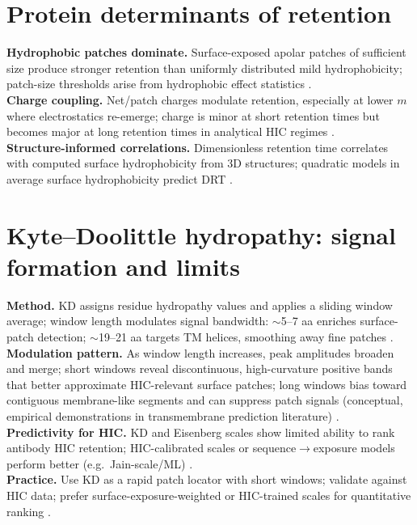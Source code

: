 \documentclass[11pt]{article}
\begin{document}
\section{Protein determinants of retention}
\textbf{Hydrophobic patches dominate.} Surface-exposed apolar patches of sufficient size produce stronger retention than uniformly distributed mild hydrophobicity; patch-size thresholds arise from hydrophobic effect statistics \cite{Waibl2022}. \\
\textbf{Charge coupling.} Net/patch charges modulate retention, especially at lower $m$ where electrostatics re-emerge; charge is minor at short retention times but becomes major at long retention times in analytical HIC regimes \cite{Hebditch2019}. \\
\textbf{Structure-informed correlations.} Dimensionless retention time correlates with computed surface hydrophobicity from 3D structures; quadratic models in average surface hydrophobicity predict DRT \cite{Lienqueo2002,Mahn2009}.

\section{Kyte–Doolittle hydropathy: signal formation and limits}
\textbf{Method.} KD assigns residue hydropathy values and applies a sliding window average; window length modulates signal bandwidth: $\sim$5–7 aa enriches surface-patch detection; $\sim$19–21 aa targets TM helices, smoothing away fine patches \cite{Kyte1982,QiagenHydropathy}. \\
\textbf{Modulation pattern.} As window length increases, peak amplitudes broaden and merge; short windows reveal discontinuous, high-curvature positive bands that better approximate HIC-relevant surface patches; long windows bias toward contiguous membrane-like segments and can suppress patch signals (conceptual, empirical demonstrations in transmembrane prediction literature) \cite{Snider2009,Deber2001}. \\
\textbf{Predictivity for HIC.} KD and Eisenberg scales show limited ability to rank antibody HIC retention; HIC-calibrated scales or sequence$\to$exposure models perform better (e.g.\ Jain-scale/ML) \cite{Waibl2022,Jain2017}. \\
\textbf{Practice.} Use KD as a rapid patch locator with short windows; validate against HIC data; prefer surface-exposure-weighted or HIC-trained scales for quantitative ranking \cite{Waibl2022,Mahn2009}.
\end{document}

